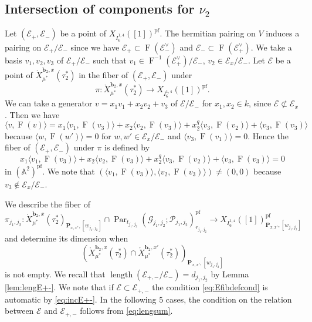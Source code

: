 \documentclass[12pt,a4paper]{article}
\DeclareMathOperator{\length}{length}
\DeclareMathOperator{\Par}{Par}
\DeclareMathOperator{\oF}{F}
\newcommand{\bA}{\mathbb{A}}
\newcommand{\bfP}{\mathbf{P}}
\newcommand{\bfb}{\mathbf{b}}
\newcommand{\cE}{\mathcal{E}}
\newcommand{\sG}{\mathscr{G}}
\newcommand{\sP}{\mathscr{P}}
\newcommand{\pf}{\mathrm{pf}}
\begin{document}
\subsection{Intersection of components for $\nu_2$}
Let 
$(\cE_+,\cE_-)$ be a point of 
$X_{I_{6}^{1,4}}([1])^{\pf}$. 
The hermitian pairing on $V$ induces a pairing on 
$\cE_+/\cE_-$ 
since we have $\cE_+ \subset \oF (\cE_-^{\vee})$ 
and 
$\cE_- \subset \oF (\cE_+^{\vee})$. 
We take 
a basis $v_1, v_2, v_3$ of 
$\cE_+/\cE_-$ such that 
$v_1 \in \oF^{-1}(\cE_+^{\vee})/\cE_-$, 
$v_2 \in \cE_x/\cE_-$. 
Let $\cE$ be a point of 
$\mathring{X}_{\mu^*}^{\bfb_2,x}(\tau_2^*)$ 
in the fiber of $(\cE_+,\cE_-)$ under 
\[
 \pi \colon 
 \mathring{X}_{\mu^*}^{\bfb_2,x}(\tau_2^*)
 \to X_{I_{6}^{1,4}}([1])^{\pf} . 
\]
We can take a generator  
$v=x_1 v_1 +x_2 v_2 +v_3$ 
of $\cE/\cE_-$ 
for $x_1,x_2 \in k$, since 
$\cE \not\subset \cE_x$. 
Then we have 
\begin{equation*}
  \langle v, \oF (v)\rangle = 
  x_1 
 \langle v_1,\oF (v_3) \rangle + 
 x_2  
 \langle v_2,\oF (v_3) \rangle +
 x_2^q 
 \langle v_3,\oF (v_2) \rangle +
  \langle v_3,\oF (v_3) \rangle 
\end{equation*}
because 
$\langle w,\oF (w') \rangle =0$ 
for $w,w' \in \cE_x/\cE_-$ and 
$\langle v_3,\oF (v_1) \rangle =0$. 
Hence the fiber of $(\cE_+,\cE_-)$ under 
$\pi$ is defined by 
\begin{equation}\label{eq:Efibdefcond}
  x_1 
 \langle v_1,\oF (v_3) \rangle + 
 x_2  
 \langle v_2,\oF (v_3) \rangle +
 x_2^q 
 \langle v_3,\oF (v_2) \rangle +
  \langle v_3,\oF (v_3) \rangle =0 
\end{equation}
in $(\bA^2)^{\pf}$. 
We note that 
$(\langle v_1,\oF (v_3) \rangle,   
 \langle v_2,\oF (v_3) \rangle) \neq (0,0)$ 
 because $v_3 \notin \cE_x/\cE_-$. 

We describe the fiber of 
\[
 \pi_{j_1,j_2} \colon 
 \mathring{X}_{\mu^*}^{\bfb_2,x}(\tau_2^*)_{\bfP_{x,x'},[w_{j_1,j_2}]} 
 \cap \Par_{t_{j_1,j_2}} 
(\sG_{j_1,j_2}; \sP_{j_1,j_2})_{r_{j_1,j_2}}^{\pf} 
 \to X_{I_{6}^{1,4}}([1])_{\bfP_{x,x'},[w_{j_1,j_2}]}^{\pf} 
\]
and determine its dimension 
when 
\[
  \left( \mathring{X}_{\mu^*}^{\bfb_2,x}(\tau_2^*) \cap \mathring{X}_{\mu^*}^{\bfb_{2},x'}(\tau_{2}^*)  \right)_{\bfP_{x,x'},[w_{j_1,j_2}]}  
\]
is not empty. 
We recall that $\length (\cE_{+,-}/\cE_-)=d_{j_1,j_2}$ by Lemma 
\ref{lem:lengE+-}. 
We note that if $\cE \subset \cE_{+,-}$ the condition 
\eqref{eq:Efibdefcond} is automatic by 
\eqref{eq:incE+-}. 
In the following $5$ cases, the condition on the relation between $\cE$ and $\cE_{+,-}$ follows from  \eqref{eq:lengsum}. 
\end{document}
